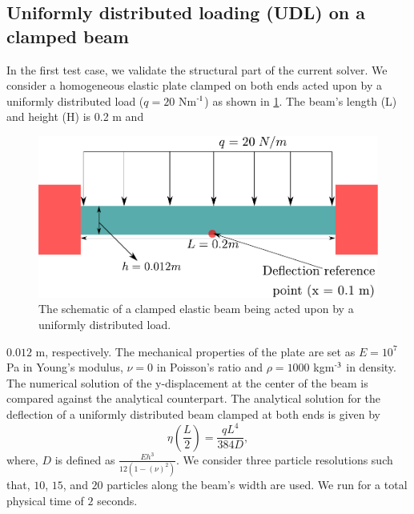 \subsection{Uniformly distributed loading (UDL) on a clamped beam}
\label{sec:udl}
In the first test case, we validate the structural part of the current solver.
We consider a homogeneous elastic plate clamped on both ends acted upon by a
uniformly distributed load ($q = 20$ Nm$\textsuperscript{-1}$) as shown in
\cref{fig:udl-schematic}. The beam's length (L) and height (H) is 0.2 m and
\begin{figure}
  \centering
  \includegraphics[scale=0.5]{images/fsi/images/khayyer_2021_udl/schematic}
  \caption{The schematic of a clamped elastic beam being acted upon by a
    uniformly distributed load.}
\label{fig:udl-schematic}
\end{figure}
$0.012$ m, respectively. The mechanical properties of the plate are set as
$E=10^7$ Pa in Young's modulus, $\nu=0$ in Poisson's ratio and $\rho=1000$
kgm$\textsuperscript{-3}$ in density. The numerical solution of the
y-displacement at the center of the beam is compared against the analytical
counterpart. The analytical solution for the deflection of a uniformly
distributed beam clamped at both ends is given by
\begin{equation}
  \label{eq:fsi:ce-tvf}
  \eta\left(\frac{L}{2}\right) = \frac{qL^4}{384 D},
\end{equation}
where, $D$ is defined as $\frac{E h^3}{12 (1 - (\nu)^2)}$. We consider three
particle resolutions such that, $10$, $15$, and $20$ particles along the beam's
width are used. We run for a total physical time of $2$ seconds.

